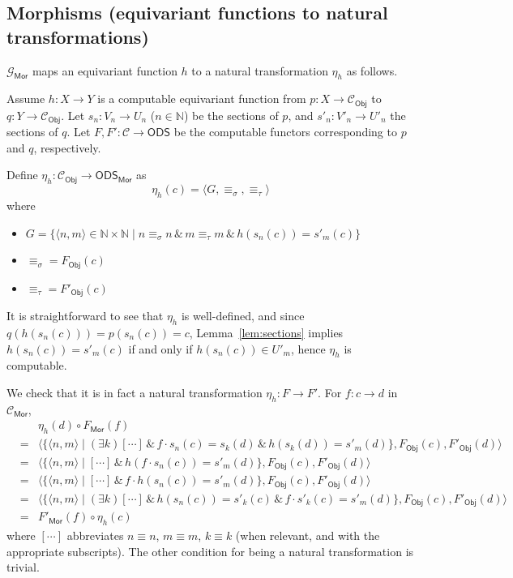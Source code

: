 \documentclass[envcountsame]{llncs}
\def\IN{{\mathbb N}}
\def\calC{{\mathcal{C}}}
\def\calG{{\mathcal{G}}}
\newcommand{\cntSets}{{\mathsf{ODS}}}
\newcommand{\Mor}{\mathsf{Mor}}
\newcommand{\Obj}{\mathsf{Obj}}
\def\src{{\sigma}}
\def\tar{{\tau}}
\begin{document}
\subsection*{Morphisms (equivariant functions to natural transformations)}

$\calG_\Mor$ maps an equivariant function $h$ to a natural transformation $\eta_h$ as follows. 

Assume $h\colon X\to Y$ is a computable equivariant function from $p\colon X \to \calC_\Obj$ to $q\colon Y \to \calC_\Obj$. Let $s_n\colon V_n \to U_n$ ($n\in\IN$) be the sections of $p$, and $s'_n\colon V'_n \to U'_n$ the sections of $q$. Let $F, F'\colon \calC\to\cntSets$ be the computable functors corresponding to $p$ and $q$, respectively.


Define $\eta_h \colon\calC_\Obj \to \cntSets_\Mor$ as 
\[\eta_h(c) = \langle G,\equiv_\src,\equiv_\tar\rangle\]
where
\begin{itemize}
\item
$G=\{ \langle n,m\rangle \in\IN\times\IN \mid n \equiv_\src n \,\&\, m \equiv_\tar m \,\&\, h(s_n(c)) = s'_m(c)\}$
\item
$\equiv_\src = F_\Obj(c)$
\item
$\equiv_\tar = F'_\Obj(c)$
\end{itemize}
It is straightforward to see that $\eta_h$ is well-defined, and since $q(h(s_n(c)))=p(s_n(c)) = c$, Lemma~\ref{lem:sections} implies $h(s_n(c)) = s'_m(c)$ if and only if $h(s_n(c))\in U'_m$, hence $\eta_h$ is computable. 

We check that it is in fact a natural transformation $\eta_h \colon F \to F'$. For $f\colon c\to d$ in  $\calC_\Mor$,
\begin{eqnarray*}
&&\eta_h(d)\circ F_\Mor(f) \\
&=&\langle \{\langle n,m\rangle \mid (\exists k) [\cdots]\,\&\, f\cdot s_n(c) = s_k(d) \,\&\, h(s_k(d)) = s'_m(d) \}, F_\Obj(c), F'_\Obj(d)\rangle\\
 &=&\langle \{\langle n,m\rangle \mid [\cdots]\,\&\, h(f\cdot s_n(c)) = s'_m(d) \}, F_\Obj(c), F'_\Obj(d)\rangle\\
  &=&\langle \{\langle n,m\rangle \mid [\cdots]\,\&\, f\cdot h(s_n(c)) = s'_m(d) \}, F_\Obj(c), F'_\Obj(d)\rangle\\
&=& \langle \{\langle n,m\rangle \mid (\exists k) [\cdots]\,\&\, h(s_n(c)) = s'_k(c) \,\&\, f\cdot s'_k(c) = s'_m(d) \}, F_\Obj(c), F'_\Obj(d)\rangle\\
&=& F'_\Mor(f) \circ \eta_h(c)
\end{eqnarray*}
where $[\cdots]$ abbreviates $n\equiv n$, $m\equiv m$, $k\equiv k$ (when relevant, and with the appropriate subscripts). The other condition for being  a natural transformation is trivial.
\end{document}
